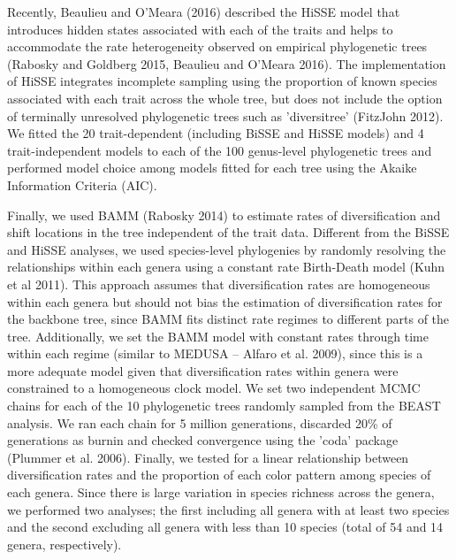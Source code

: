Recently, Beaulieu and O'Meara (2016) described the HiSSE model that introduces hidden states associated with each of the traits and helps to accommodate the rate heterogeneity observed on empirical phylogenetic trees (Rabosky and Goldberg 2015, Beaulieu and O'Meara 2016). The implementation of HiSSE integrates incomplete sampling using the proportion of known species associated with each trait across the whole tree, but does not include the option of terminally unresolved phylogenetic trees such as 'diversitree' (FitzJohn 2012). We fitted the 20 trait-dependent (including BiSSE and HiSSE models) and 4 trait-independent models to each of the 100 genus-level phylogenetic trees and performed model choice among models fitted for each tree using the Akaike Information Criteria (AIC).

Finally, we used BAMM (Rabosky 2014) to estimate rates of diversification and shift locations in the tree independent of the trait data. Different from the BiSSE and HiSSE analyses, we used species-level phylogenies by randomly resolving the relationships within each genera using a constant rate Birth-Death model (Kuhn et al 2011). This approach assumes that diversification rates are homogeneous within each genera but should not bias the estimation of diversification rates for the backbone tree, since BAMM fits distinct rate regimes to different parts of the tree. Additionally, we set the BAMM model with constant rates through time within each regime (similar to MEDUSA – Alfaro et al. 2009), since this is a more adequate model given that diversification rates within genera were constrained to a homogeneous clock model. We set two independent MCMC chains for each of the 10 phylogenetic trees randomly sampled from the BEAST analysis. We ran each chain for 5 million generations, discarded 20\% of generations as burnin and checked convergence using the 'coda' package (Plummer et al. 2006). Finally, we tested for a linear relationship between diversification rates and the proportion of each color pattern among species of each genera. Since there is large variation in species richness across the genera, we performed two analyses; the first including all genera with at least two species and the second excluding all genera with less than 10 species (total of 54 and 14 genera, respectively).

